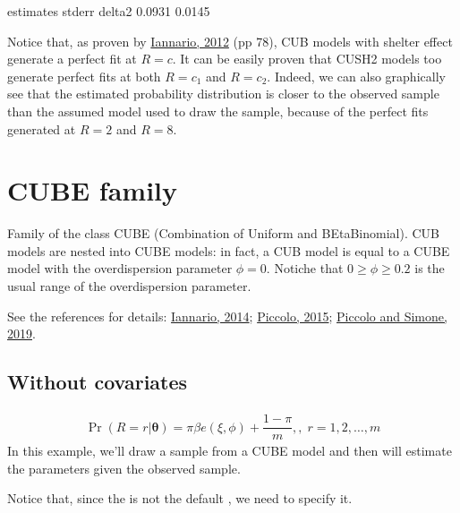 \documentclass[letterpaper,10pt,english]{sphinxmanual}
\begin{document}
\noindent{}

\begin{sphinxVerbatim}[commandchars=\\\{\}]
     estimates  stderr
delta2  0.0931  0.0145
\end{sphinxVerbatim}

\sphinxAtStartPar
Notice that, as proven by \hyperlink{cite.references:id9}{Iannario, 2012} (pp 7\sphinxhyphen{}8), CUB models with shelter effect
generate a perfect fit at \(R=c\). It can be easily proven that
CUSH2 models too generate perfect fits at both \(R=c_1\) and \(R=c_2\).
Indeed, we can also graphically see that the estimated probability distribution is
closer to the observed sample than the assumed model used to draw the sample, because
of the perfect fits generated at \(R=2\) and \(R=8\).


\section{CUBE family}
\label{\detokenize{manual:cube-family}}
\sphinxAtStartPar
Family of the class CUBE (Combination of Uniform and BEtaBinomial).
CUB models are nested into CUBE models: in fact, a CUB model is equal to
a CUBE model with the overdispersion parameter \(\phi=0\).
Notiche that \(0\geq\phi\geq0.2\) is the usual range of the overdispersion parameter.

\sphinxAtStartPar
See the references for details: \hyperlink{cite.references:id16}{Iannario, 2014}; \hyperlink{cite.references:id14}{Piccolo, 2015};
\hyperlink{cite.references:id3}{Piccolo and Simone, 2019}.


\subsection{Without covariates}
\label{\detokenize{manual:cube-without-covariates}}\label{\detokenize{manual:id33}}
\sphinxAtStartPar
{}
\begin{equation*}
\begin{split}\Pr(R=r|\pmb{\theta}) = \pi \beta e(\xi,\phi)+\dfrac{1-\pi}{m},
,\; r=1,2,\ldots,m\end{split}
\end{equation*}
\sphinxAtStartPar
In this example, we’ll draw a sample from a CUBE model and then
will estimate the parameters given the observed sample.

\sphinxAtStartPar
Notice that, since the  is not the default , we need to specify it.
\end{document}
